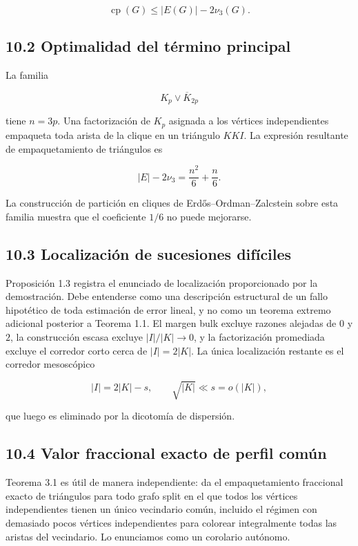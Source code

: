 \documentclass[
  11pt,
]{article}
\begin{document}
\[
\operatorname{cp}(G)
\le
|E(G)|-2\nu_3(G).
\]

\subsection{10.2 Optimalidad del término
principal}\label{optimalidad-del-tuxe9rmino-principal}

La familia

\[
K_p\vee\overline K_{2p}
\]

tiene \(n=3p\). Una factorización de \(K_p\) asignada a los vértices
independientes empaqueta toda arista de la clique en un triángulo
\(KKI\). La expresión resultante de empaquetamiento de triángulos es

\[
|E|-2\nu_3
=
\frac{n^2}{6}+\frac n6.
\tag{10.1}
\]

La construcción de partición en cliques de Erdős--Ordman--Zalcstein
sobre esta familia muestra que el coeficiente \(1/6\) no puede
mejorarse.

\subsection{10.3 Localización de sucesiones
difíciles}\label{localizaciuxf3n-de-sucesiones-difuxedciles}

Proposición 1.3 registra el enunciado de localización proporcionado por
la demostración. Debe entenderse como una descripción estructural de un
fallo hipotético de toda estimación de error lineal, y no como un
teorema extremo adicional posterior a Teorema 1.1. El margen bulk
excluye razones alejadas de \(0\) y \(2\), la construcción escasa
excluye \(|I|/|K|\to0\), y la factorización promediada excluye el
corredor corto cerca de \(|I|=2|K|\). La única localización restante es
el corredor mesoscópico

\[
|I|=2|K|-s,
\qquad
\sqrt{|K|}\ll s=o(|K|),
\]

que luego es eliminado por la dicotomía de dispersión.

\subsection{10.4 Valor fraccional exacto de perfil
común}\label{valor-fraccional-exacto-de-perfil-comuxfan}

Teorema 3.1 es útil de manera independiente: da el empaquetamiento
fraccional exacto de triángulos para todo grafo split en el que todos
los vértices independientes tienen un único vecindario común, incluido
el régimen con demasiado pocos vértices independientes para colorear
integralmente todas las aristas del vecindario. Lo enunciamos como un
corolario autónomo.
\end{document}
